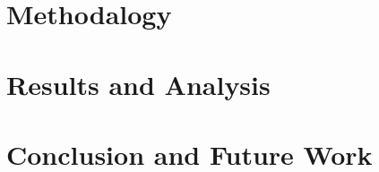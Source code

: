 \documentclass[thesis,fonts=libertine]{cluu}
\begin{document}
\chapter{Methodalogy}
\label{chap:method}

\chapter{Results and Analysis}
\label{chap:results}

\chapter{Conclusion and Future Work}
\label{chap:analysis}

\printbibliography
\end{document}

